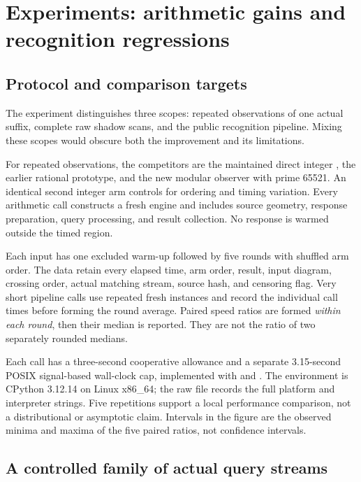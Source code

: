 \section{Experiments: arithmetic gains and recognition regressions}
\label{sec:experiments}

\subsection{Protocol and comparison targets}

The experiment distinguishes three scopes: repeated observations of one actual
suffix, complete raw shadow scans, and the public recognition pipeline. Mixing
these scopes would obscure both the improvement and its limitations.

For repeated observations, the competitors are the maintained direct integer
, the earlier rational
 prototype, and the new modular
observer with prime 65521. An identical second integer arm controls for ordering
and timing variation. Every arithmetic call constructs a fresh engine and
includes source geometry, response preparation, query processing, and result
collection. No response is warmed outside the timed region.

Each input has one excluded warm-up followed by five rounds with shuffled arm
order. The data retain every elapsed time, arm order, result, input diagram,
crossing order, actual matching stream, source hash, and censoring flag. Very
short pipeline calls use repeated fresh instances and record the individual
call times before forming the round average. Paired speed ratios are formed
\emph{within each round}, then their median is reported. They are not the ratio
of two separately rounded medians.

Each call has a three-second cooperative allowance and a separate 3.15-second
POSIX signal-based wall-clock cap, implemented with  and
. The environment is CPython 3.12.14 on Linux x86\_64; the raw file
records the full platform and interpreter strings. Five repetitions support a
local performance comparison, not a distributional or asymptotic claim.
Intervals in the figure are the observed minima and maxima of the five paired
ratios, not confidence intervals.

\subsection{A controlled family of actual query streams}


